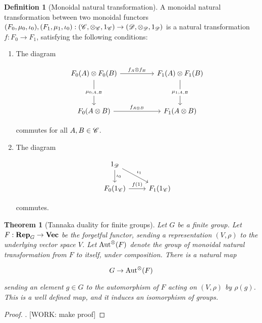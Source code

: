 \documentclass{article}
\newtheorem{theorem}{Theorem}
\theoremstyle{definition}
\newtheorem*{definition}{Definition}
\numberwithin{figure}{section}
\begin{document}
\begin{definition}[Monoidal natural transformation] A monoidal natural transformation between two monoidal functors $(F_0,\mu_0,\iota_0), (F_1,\mu_1,\iota_0): (\mathscr{C},\otimes_{\mathscr{C}},1_{\mathscr{C}})\to(\mathscr{D},\otimes_{\mathscr{D}},1_{\mathscr{D}})$ is a natural transformation $f:F_0\to F_1$, satisfying the following conditions:

\begin{enumerate}
\item The diagram

\[\begin{tikzcd}
	{F_0(A)\otimes F_0(B)} && {F_1(A)\otimes F_1(B)} \\
	\\
	{F_0(A\otimes B)} && {F_1(A\otimes B)}
	\arrow["{f_A\otimes f_B}", from=1-1, to=1-3]
	\arrow["{f_{A\otimes B}}", from=3-1, to=3-3]
	\arrow["{\mu_{0;A,B}}"{description}, from=1-1, to=3-1]
	\arrow["{\mu_{1;A,B}}"{description}, from=1-3, to=3-3]
\end{tikzcd}\]

commutes for all $A,B\in \mathscr{C}$.

\item The diagram

\[\begin{tikzcd}
	{1_{\Dcat}} \\
	{F_0(1_{\Ccat})} & {F_1(1_{\Ccat})}
	\arrow["{\iota_0}", from=1-1, to=2-1]
	\arrow["{\iota_1}", from=1-1, to=2-2]
	\arrow["{f(1)}", from=2-1, to=2-2]
\end{tikzcd}\]

commutes.
\end{enumerate}
\end{definition}

\begin{theorem}[Tannaka duality for finite groups] Let $G$ be a finite group. Let $F:\bold{Rep}_G\to \bold{Vec}$ be the forgetful functor, sending a representation $(V,\rho)$ to the underlying vector space $V$. Let $\mathrm{Aut}^\otimes(F)$ denote the group of monoidal natural transformation from $F$ to itself, under composition. There is a natural map

$$G\to \mathrm{Aut}^{\otimes}(F)$$

sending an element $g\in G$ to the automorphism of $F$ acting on $(V,\rho)$ by $\rho(g)$. This is a well defined map, and it induces an isomorphism of groups.
\end{theorem}
\begin{proof}. [WORK: make proof]
\end{proof}




\end{document}
